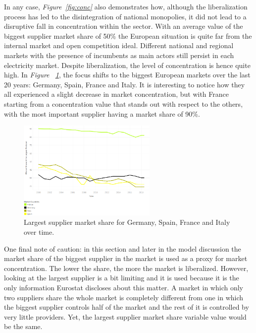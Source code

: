 \documentclass[a4paper,12pt]{book}
\begin{document}
In any case, \textit{Figure~\ref{fig:conc}} also demonstrates how, although the liberalization process has led to the disintegration of national monopolies, it did not lead to a disruptive fall in concentration within the sector. With an average value of the biggest  supplier market share of 50\% the European situation is quite far from the internal market and open competition ideal. Different national and regional markets with the presence of incumbents as main actors still persist in each electricity market. Despite liberalization, the level of concentration is hence quite high.  In \textit{Figure ~\ref{fig:conc-mc}}, the focus shifts to the biggest European markets over the last 20 years: Germany, Spain, France and Italy. It is interesting to notice how they all experienced a slight decrease in market concentration, but with France starting from a concentration value that stands out with respect to the others, with the most important supplier having a market share of 90\%.

\begin{figure}[tb]
\begin{center}
\captionsetup{justification=centering}
\includegraphics[width=0.6\textwidth]{Images/conc-mc.png}
\caption{Largest supplier market share for Germany, Spain, France and Italy over time. }
\label{fig:conc-mc}
\end{center}
\end{figure}

One final note of caution: in this section and later in the model discussion the market share of the biggest supplier in the market is used as a proxy for market concentration. The lower the share, the more the market is liberalized. However, looking at the largest supplier is a bit limiting and it is used because it is the only information Eurostat discloses about this matter. A market in which only two suppliers share the whole market is completely different from one in which the biggest supplier controls half of the market and the rest of it is controlled by very little providers. Yet, the largest supplier market share variable value would be the same.
\end{document}
